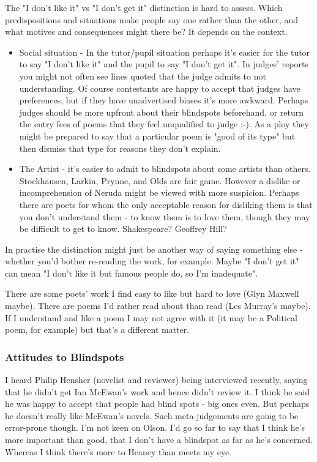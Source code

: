 \documentclass[11pt]{article}
\begin{document}
The "I don't like it" vs "I don't get it" distinction is hard to assess. Which predispositions and situations make people say one rather than the other, and what motives and consequences might there be? It depends on the context.
\begin{itemize}
\item Social situation - In the tutor/pupil situation perhaps it's easier for the
  tutor to say "I don't like it" and the pupil to say "I don't get it". In
  judges' reports you might not often see lines quoted that the judge admits to
  not understanding. Of course contestants are happy to accept that judges have
  preferences, but if they have unadvertised biases it's more awkward. Perhaps
  judges should be more upfront about their blindspots beforehand, or return
  the entry fees of poems that they feel unqualified to judge :-). As a ploy they might be prepared to say that a particular poem is "good of its type" but then dismiss that type for reasons they don't explain. 
\item The Artist - it's easier to admit to blindspots about some artists than
  others. Stockhausen, Larkin, Prynne, and Olds are fair game. However a
  dislike or incomprehension of Neruda might be viewed with more
  suspicion. Perhaps there are poets for whom the only acceptable reason for
  disliking them is that you don't understand them - to know them is to love
  them, though they may be difficult to get to know. Shakespeare? Geoffrey Hill?

\end{itemize}


In practise the distinction might just be another way of saying something else
- whether you'd bother re-reading the work, for example. Maybe "I don't get it"
can mean "I don't like it but famous people do, so I'm inadequate". 



There are some poets' work I find easy to like but hard to love (Glyn Maxwell
maybe). There are poems I'd rather read about than read (Les Murray's
maybe). If I understand and like a poem I may not agree with it (it may be
a Political poem, for example) but that's a different matter. 



\subsubsection*{Attitudes to Blindspots}


 I heard Philip Hensher (novelist and reviewer) being interviewed recently,
 saying that he didn't get Ian McEwan's work and hence didn't review
 it. I think he said he
 was happy to accept that 
people had blind spots - big ones even. But perhaps he doesn't really like
 McEwan's novels. Such meta-judgements are going to be error-prone though.
I'm not keen on Olson. I'd go so far to say that I think he's more important than good, that I don't have a blindspot as far as he's concerned. Whereas I think there's more to Heaney than meets my eye. 
\end{document}
